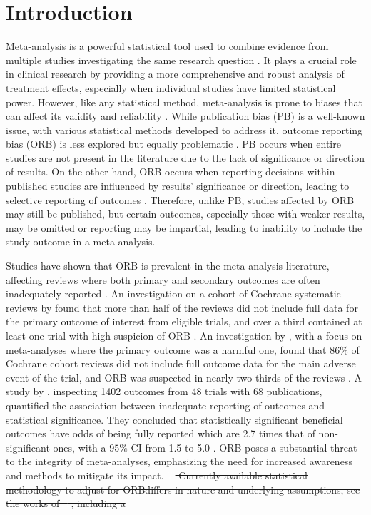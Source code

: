 \documentclass[twocolumn]{article}\usepackage[]{graphicx}\usepackage[]{xcolor}
\providecommand{\DIFdeltex}[1]{{\protect\color{red}\sout{#1}}}                      %
\providecommand{\DIFaddbegin}{} %
\providecommand{\DIFdelbegin}{} %
\providecommand{\DIFdelend}{} %
\providecommand{\DIFdel}[1]{\texorpdfstring{\DIFdeltex{#1}}{}} %
\newcommand{\DIFscaledelfig}{0.5}
\newlength{\DIFdelgraphicswidth} %
\newlength{\DIFdelgraphicsheight} %
\newcommand{\DIFaddincludegraphics}[2][]{{\color{blue}\fbox{\DIFOincludegraphics[#1]{#2}}}} %
\newcommand{\DIFdelincludegraphics}[2][]{%
\sbox{\DIFdelgraphicsbox}{\DIFOincludegraphics[#1]{#2}}%
\settoboxwidth{\DIFdelgraphicswidth}{\DIFdelgraphicsbox} %
\settoboxtotalheight{\DIFdelgraphicsheight}{\DIFdelgraphicsbox} %
\scalebox{\DIFscaledelfig}{%
\parbox[b]{\DIFdelgraphicswidth}{\usebox{\DIFdelgraphicsbox}\\[-\baselineskip] \rule{\DIFdelgraphicswidth}{0em}}\llap{\resizebox{\DIFdelgraphicswidth}{\DIFdelgraphicsheight}{%
\setlength{\unitlength}{\DIFdelgraphicswidth}%
\begin{picture}(1,1)%
\thicklines\linethickness{2pt} %
{\color[rgb]{1,0,0}\put(0,0){\framebox(1,1){}}}%
{\color[rgb]{1,0,0}\put(0,0){\line( 1,1){1}}}%
{\color[rgb]{1,0,0}\put(0,1){\line(1,-1){1}}}%
\end{picture}%
}\hspace*{3pt}}} %
} %
\DeclareRobustCommand{\DIFaddbegin}{\DIFOaddbegin \let\includegraphics\DIFaddincludegraphics} %
\DeclareRobustCommand{\DIFdelbegin}{\DIFOdelbegin \let\includegraphics\DIFdelincludegraphics} %
\DeclareRobustCommand{\DIFdelend}{\DIFOaddend \let\includegraphics\DIFOincludegraphics} %
\begin{document}
\section{Introduction}
Meta-analysis is a powerful statistical tool used to combine evidence from multiple studies investigating the same research question \citep{DerSimonian, handbook}. It plays a crucial role in clinical research by providing a more comprehensive and robust analysis of treatment effects, especially when individual studies have limited statistical power. However, like any statistical method, meta-analysis is prone to biases that can affect its validity and reliability \citep{handbook, Schmid2022, Egger2022}. While publication bias (PB) is a well-known issue, with various statistical methods developed to address it, outcome reporting bias (ORB) is less explored but equally problematic \citep{handbook, Schmid2022, Egger2022, protocolORB}. PB occurs when entire studies are not present in the literature due to the lack of significance or direction of results. On the other hand, ORB occurs when reporting decisions within published studies are influenced by results' significance or direction, leading to selective reporting of outcomes \citep{ORBimpact, Copas2014, Copas2019, Schmid2022, Kirkham2012, Egger2022, dutch}. Therefore, unlike PB, studies affected by ORB may still be published, but certain outcomes, especially those with weaker results, may be omitted or reporting may be impartial, leading to inability to include the study outcome in a meta-analysis. 

Studies have shown that ORB is prevalent in the meta-analysis literature, affecting reviews where both primary and secondary outcomes are often inadequately reported \citep{moreORBevidence, ORBimpact, ORBIT_paper}. An investigation on a cohort of Cochrane systematic reviews by \citet{ORBimpact} found that more than half of the reviews did not include full data for the primary outcome of interest from eligible trials, and over a third contained at least one trial with high suspicion of ORB \citep{ORBimpact}. An investigation by \citet{ORBIT_paper}, with a focus on meta-analyses where the primary outcome was a harmful one, found that $86\%$ of Cochrane cohort reviews did not include full outcome data for the main adverse event of the trial, and ORB was suspected in nearly two thirds of the reviews \citep{ORBIT_paper}. A study by \citet{moreORBevidence}, inspecting 1402 outcomes from 48 trials with 68 publications, quantified the association between inadequate reporting of outcomes and statistical significance. They concluded that statistically significant beneficial outcomes have odds of being fully reported which are 2.7 times that of non-significant ones, with a $95 \%$ CI from 1.5 to 5.0 \citep{moreORBevidence}. ORB poses a substantial threat to the integrity of meta-analyses, emphasizing the need for increased awareness and methods to mitigate its impact.
\DIFdelbegin %
\DIFdel{$\textcolor{white}{T}$ Currently available statistical methodology to adjust for ORBdiffers in nature and underlying assumptions, see the works of \mbox{%
\citet{Kirkham2012, Copas2014, Copas2019, Bay, dutch}}\hskip0pt%
, including a }\DIFdelend \DIFaddbegin 
\end{document}
